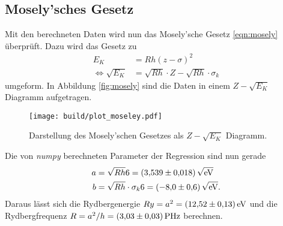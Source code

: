 

\subsection{Mosely'sches Gesetz}
\label{sec:Mosely}
Mit den berechneten Daten wird nun das Mosely'sche Gesetz \eqref{eqn:mosely} überprüft. Dazu wird das Gesetz zu 
\begin{align*}
    E_K &= R h (z - \sigma)^2 \\
    \Leftrightarrow\sqrt{E_K} &= \sqrt{R h}\cdot Z - \sqrt{R h}\cdot\sigma_k
\end{align*} 
umgeform. In Abbildung \ref{fig:mosely} sind die Daten in einem $Z-\sqrt{E_K}$ Diagramm aufgetragen. 
\begin{figure}
    \centering
    \texttt{[image: build/plot\_moseley.pdf]}
    \caption{Darstellung des Mosely'schen Gesetzes als $Z-\sqrt{E_K}$ Diagramm.}
    \label{fig:moseley}
\end{figure}
Die von \textit{numpy} \cite{numpy} berechneten Parameter der Regression sind nun gerade 
\begin{align*}
    a&=\sqrt{R h}              6=\SI{3.539\pm 0.018}{\sqrt{\electronvolt}}\\
    b&=\sqrt{R h}\cdot\sigma_k 6=\SI{-8.0 \pm 0.6}{\sqrt{\electronvolt}}.
\end{align*}
Daraus lässt sich die Rydbergenergie $Ry=a^2=\SI{12.52\pm 0.13}{\electronvolt}$ und die Rydbergfrequenz $R=a^2/h=\SI{3.03\pm 0.03}{\peta\hertz}$
berechnen. 